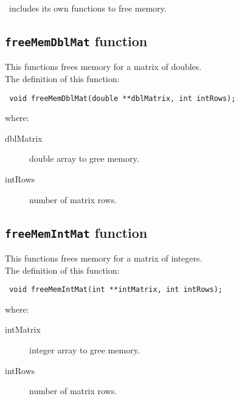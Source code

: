 \BI\ includes its own functions to free memory.

\subsection{\texttt{freeMemDblMat} function} \label{sec:freeMemDblMat}

This functions frees memory for a matrix of doubles.\\

The definition of this function:
%
\begin{verbatim}
 void freeMemDblMat(double **dblMatrix, int intRows);
\end{verbatim}
%
where:
%
\begin{description}
\item[dblMatrix] double array to gree memory.
\item[intRows] number of matrix rows.
\end{description}

\subsection{\texttt{freeMemIntMat} function} \label{sec:freeMemIntMat}

This functions frees memory for a matrix of integers.\\

The definition of this function:
%
\begin{verbatim}
 void freeMemIntMat(int **intMatrix, int intRows);
\end{verbatim}
%
where:
%
\begin{description}
\item[intMatrix] integer array to gree memory.
\item[intRows] number of matrix rows.
\end{description}

